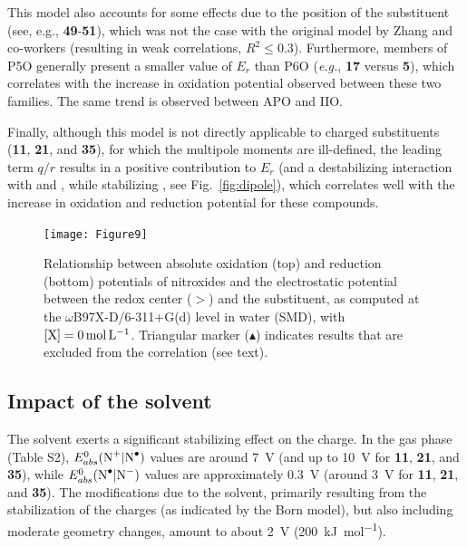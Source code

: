 \documentclass[review,preprint]{elsarticle}
\begin{document}
This model also accounts for some effects due to the position of the substituent (see, e.g., \textbf{49}-\textbf{51}), which was not the case with the original model by Zhang and co-workers (resulting in weak correlations, $R^2 \leq 0.3$). Furthermore, members of P5O generally present a smaller value of $E_r$ than P6O (\textit{e.g.}, \textbf{17} versus \textbf{5}), which correlates with the increase in oxidation potential observed between these two families. The same trend is observed between APO and IIO.

Finally, although this model is not directly applicable to charged substituents (\textbf{11}, \textbf{21}, and \textbf{35}), for which the multipole moments are ill-defined, the leading term $q/r$ results in a positive contribution to $E_r$ (and a destabilizing interaction with  and , while stabilizing , see Fig.~\ref{fig:dipole}), which correlates well with the increase in oxidation and reduction potential for these compounds.


\begin{figure}[!h]
\centering
\texttt{[image: Figure9]}
\caption{Relationship between absolute oxidation (top) and reduction (bottom) potentials of nitroxides and the electrostatic potential between the redox center ($>$) and the substituent, as computed at the $\omega$B97X-D/6-311+G(d) level in water (SMD), with $[\ce{X}]=\SI{0}{\mole\per\liter}$. Triangular marker ($\blacktriangle$) indicates results that are excluded from the correlation (see text).}
\label{fig:corr} 
\end{figure}

\clearpage

\subsection{Impact of the solvent} \label{sec:solv}

The solvent exerts a significant stabilizing effect on the charge. In the gas phase (Table S2), $E^0_{abs}(\ce{N+}|\ce{N^.})$ values are around \SI{7}{\volt} (and up to \SI{10}{\volt} for \textbf{11}, \textbf{21}, and \textbf{35}), while $E^0_{abs}(\ce{N^.}|\ce{N-})$ values are approximately \SI{0.3}{\volt} (around \SI{3}{\volt} for \textbf{11}, \textbf{21}, and \textbf{35}). The modifications due to the solvent, primarily resulting from the stabilization of the charges (as indicated by the Born model), but also including moderate geometry changes, amount to about \SI{2}{\volt} (\SI{200}{\kilo\joule\per\mole}).
\end{document}
